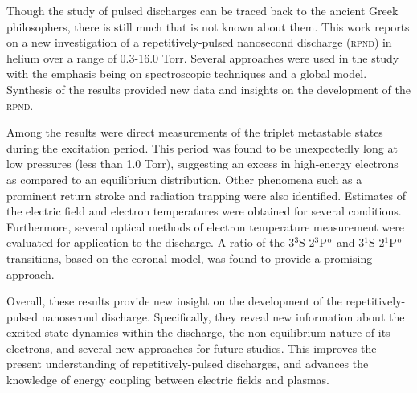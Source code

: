 Though the study of pulsed discharges can be traced back to the ancient Greek
philosophers, there is still much that is not known about them. This work
reports on a new investigation of a repetitively-pulsed nanosecond discharge
(\textsc{rpnd}) in helium over a range of 0.3-16.0 Torr. Several approaches were
used in the study with the emphasis being on spectroscopic techniques and a
global model. Synthesis of the results provided new data and insights on the
development of the \textsc{rpnd}.

Among the results were direct measurements of the triplet metastable states
during the excitation period. This period was found to be unexpectedly long at
low pressures (less than 1.0 Torr), suggesting an excess in high-energy
electrons as compared to an equilibrium distribution. Other phenomena such as a
prominent return stroke and radiation trapping were also identified. Estimates
of the electric field and electron temperatures were obtained for several
conditions. Furthermore, several optical methods of electron temperature
measurement were evaluated for application to the discharge. A ratio of the
3$^3$S-2$^3$P$^\mathrm{o}$ and 3$^1$S-2$^1$P$^\mathrm{o}$ transitions, based on the coronal
model, was found to provide a promising approach.

Overall, these results provide new insight on the development of the
repetitively-pulsed nanosecond discharge. Specifically, they reveal new
information about the excited state dynamics within the discharge, the
non-equilibrium nature of its electrons, and several new approaches for future
studies. This improves the present understanding of repetitively-pulsed
discharges, and advances the knowledge of energy coupling between electric
fields and plasmas.
